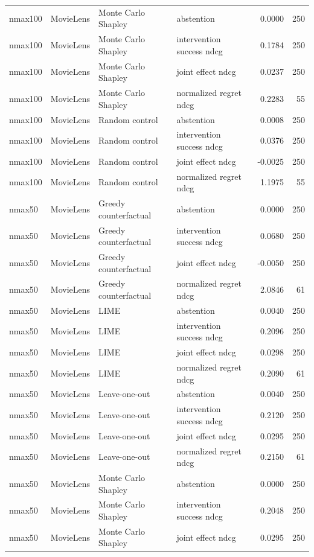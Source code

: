 \begin{longtable}{@{}p{}p{}p{}p{}rr@{}}
nmax100 & MovieLens & Monte Carlo Shapley & abstention & 0.0000 & 250 \\
nmax100 & MovieLens & Monte Carlo Shapley & intervention success ndcg & 0.1784 & 250 \\
nmax100 & MovieLens & Monte Carlo Shapley & joint effect ndcg & 0.0237 & 250 \\
nmax100 & MovieLens & Monte Carlo Shapley & normalized regret ndcg & 0.2283 & 55 \\
nmax100 & MovieLens & Random control & abstention & 0.0008 & 250 \\
nmax100 & MovieLens & Random control & intervention success ndcg & 0.0376 & 250 \\
nmax100 & MovieLens & Random control & joint effect ndcg & -0.0025 & 250 \\
nmax100 & MovieLens & Random control & normalized regret ndcg & 1.1975 & 55 \\
nmax50 & MovieLens & Greedy counterfactual & abstention & 0.0000 & 250 \\
nmax50 & MovieLens & Greedy counterfactual & intervention success ndcg & 0.0680 & 250 \\
nmax50 & MovieLens & Greedy counterfactual & joint effect ndcg & -0.0050 & 250 \\
nmax50 & MovieLens & Greedy counterfactual & normalized regret ndcg & 2.0846 & 61 \\
nmax50 & MovieLens & LIME & abstention & 0.0040 & 250 \\
nmax50 & MovieLens & LIME & intervention success ndcg & 0.2096 & 250 \\
nmax50 & MovieLens & LIME & joint effect ndcg & 0.0298 & 250 \\
nmax50 & MovieLens & LIME & normalized regret ndcg & 0.2090 & 61 \\
nmax50 & MovieLens & Leave-one-out & abstention & 0.0040 & 250 \\
nmax50 & MovieLens & Leave-one-out & intervention success ndcg & 0.2120 & 250 \\
nmax50 & MovieLens & Leave-one-out & joint effect ndcg & 0.0295 & 250 \\
nmax50 & MovieLens & Leave-one-out & normalized regret ndcg & 0.2150 & 61 \\
nmax50 & MovieLens & Monte Carlo Shapley & abstention & 0.0000 & 250 \\
nmax50 & MovieLens & Monte Carlo Shapley & intervention success ndcg & 0.2048 & 250 \\
nmax50 & MovieLens & Monte Carlo Shapley & joint effect ndcg & 0.0295 & 250 \\

\end{longtable}
